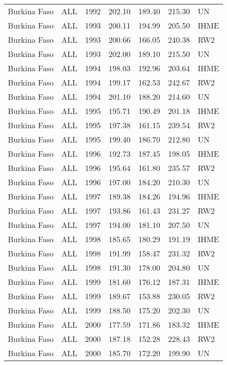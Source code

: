\begin{longtable}{lllrrrl}
  Burkina Faso & ALL & 1992 & 202.10 & 189.40 & 215.30 & UN \\ 
  Burkina Faso & ALL & 1993 & 200.11 & 194.99 & 205.50 & IHME \\ 
  Burkina Faso & ALL & 1993 & 200.66 & 166.05 & 240.38 & RW2 \\ 
  Burkina Faso & ALL & 1993 & 202.00 & 189.10 & 215.50 & UN \\ 
  Burkina Faso & ALL & 1994 & 198.03 & 192.96 & 203.64 & IHME \\ 
  Burkina Faso & ALL & 1994 & 199.17 & 162.53 & 242.67 & RW2 \\ 
  Burkina Faso & ALL & 1994 & 201.10 & 188.20 & 214.60 & UN \\ 
  Burkina Faso & ALL & 1995 & 195.71 & 190.49 & 201.18 & IHME \\ 
  Burkina Faso & ALL & 1995 & 197.38 & 161.15 & 239.54 & RW2 \\ 
  Burkina Faso & ALL & 1995 & 199.40 & 186.70 & 212.80 & UN \\ 
  Burkina Faso & ALL & 1996 & 192.73 & 187.45 & 198.05 & IHME \\ 
  Burkina Faso & ALL & 1996 & 195.64 & 161.80 & 235.57 & RW2 \\ 
  Burkina Faso & ALL & 1996 & 197.00 & 184.20 & 210.30 & UN \\ 
  Burkina Faso & ALL & 1997 & 189.38 & 184.26 & 194.96 & IHME \\ 
  Burkina Faso & ALL & 1997 & 193.86 & 161.43 & 231.27 & RW2 \\ 
  Burkina Faso & ALL & 1997 & 194.00 & 181.10 & 207.50 & UN \\ 
  Burkina Faso & ALL & 1998 & 185.65 & 180.29 & 191.19 & IHME \\ 
  Burkina Faso & ALL & 1998 & 191.99 & 158.47 & 231.32 & RW2 \\ 
  Burkina Faso & ALL & 1998 & 191.30 & 178.00 & 204.80 & UN \\ 
  Burkina Faso & ALL & 1999 & 181.60 & 176.12 & 187.31 & IHME \\ 
  Burkina Faso & ALL & 1999 & 189.67 & 153.88 & 230.05 & RW2 \\ 
  Burkina Faso & ALL & 1999 & 188.50 & 175.20 & 202.30 & UN \\ 
  Burkina Faso & ALL & 2000 & 177.59 & 171.86 & 183.32 & IHME \\ 
  Burkina Faso & ALL & 2000 & 187.18 & 152.28 & 228.43 & RW2 \\ 
  Burkina Faso & ALL & 2000 & 185.70 & 172.20 & 199.90 & UN \\ 

\end{longtable}
